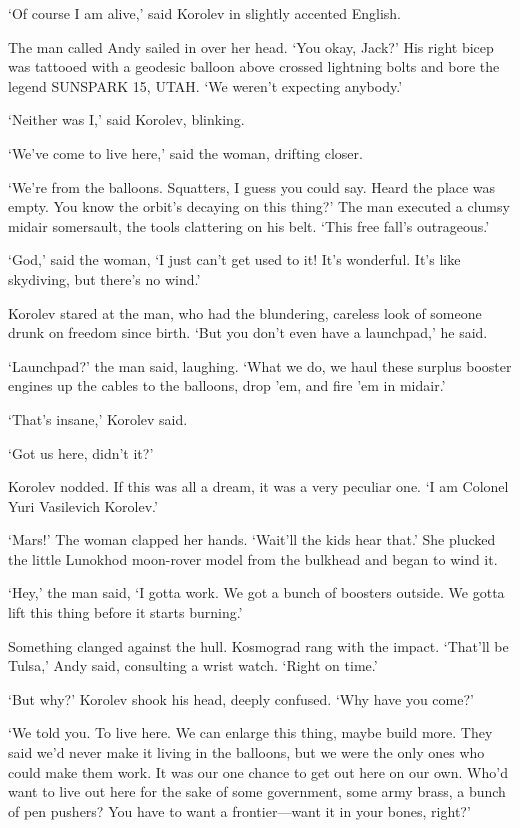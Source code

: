 ‘Of course I am alive,’ said Korolev in slightly accented English.

The man called Andy sailed in over her head. ‘You okay, Jack?’ His right bicep was tattooed with a geodesic balloon above crossed lightning bolts and bore the legend SUNSPARK 15, UTAH. ‘We weren’t expecting anybody.’

‘Neither was I,’ said Korolev, blinking.

‘We’ve come to live here,’ said the woman, drifting closer.

‘We’re from the balloons. Squatters, I guess you could say. Heard the place was empty. You know the orbit’s decaying on this thing?’ The man executed a clumsy midair somersault, the tools clattering on his belt. ‘This free fall’s outrageous.’

‘God,’ said the woman, ‘I just can’t get used to it! It’s wonderful. It’s like skydiving, but there’s no wind.’

Korolev stared at the man, who had the blundering, careless look of someone drunk on freedom since birth. ‘But you don’t even have a launchpad,’ he said.

‘Launchpad?’ the man said, laughing. ‘What we do, we haul these surplus booster engines up the cables to the balloons, drop ’em, and fire ’em in midair.’

‘That’s insane,’ Korolev said.

‘Got us here, didn’t it?’

Korolev nodded. If this was all a dream, it was a very peculiar one. ‘I am Colonel Yuri Vasilevich Korolev.’

‘Mars!’ The woman clapped her hands. ‘Wait’ll the kids hear that.’ She plucked the little Lunokhod moon-rover model from the bulkhead and began to wind it.

‘Hey,’ the man said, ‘I gotta work. We got a bunch of boosters outside. We gotta lift this thing before it starts burning.’

Something clanged against the hull. Kosmograd rang with the impact. ‘That’ll be Tulsa,’ Andy said, consulting a wrist watch. ‘Right on time.’

‘But why?’ Korolev shook his head, deeply confused. ‘Why have you come?’

‘We told you. To live here. We can enlarge this thing, maybe build more. They said we’d never make it living in the balloons, but we were the only ones who could make them work. It was our one chance to get out here on our own. Who’d want to live out here for the sake of some government, some army brass, a bunch of pen pushers? You have to want a frontier—want it in your bones, right?’


